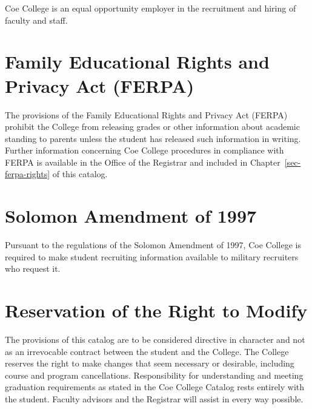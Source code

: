 \documentclass[
  letterpaper,
]{scrbook}
\renewcommand{\part}[1]{\addcontentsline{toc}{part}{#1}}
\begin{document}

Coe College is an equal opportunity employer in the recruitment and
hiring of faculty and staff.

\section*{Family Educational Rights and Privacy Act
(FERPA)}\label{family-educational-rights-and-privacy-act-ferpa}


The provisions of the Family Educational Rights and Privacy Act (FERPA)
prohibit the College from releasing grades or other information about
academic standing to parents unless the student has released such
information in writing. Further information concerning Coe College
procedures in compliance with FERPA is available in the Office of the
Registrar and included in Chapter~\ref{sec-ferpa-rights} of this
catalog.

\section*{Solomon Amendment of 1997}\label{solomon-amendment-of-1997}


Pursuant to the regulations of the Solomon Amendment of 1997, Coe
College is required to make student recruiting information available to
military recruiters who request it.

\section*{Reservation of the Right to
Modify}\label{reservation-of-the-right-to-modify}


The provisions of this catalog are to be considered directive in
character and not as an irrevocable contract between the student and the
College. The College reserves the right to make changes that seem
necessary or desirable, including course and program cancellations.
Responsibility for understanding and meeting graduation requirements as
stated in the Coe College Catalog rests entirely with the student.
Faculty advisors and the Registrar will assist in every way possible.

\part{INTRODUCTORY RESOURCES}
\end{document}
